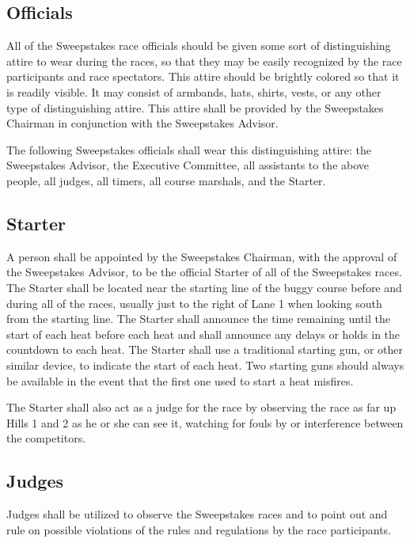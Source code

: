 \subsection{Officials}

	All of the Sweepstakes race officials should be given some sort of distinguishing attire to wear during the races, so that they may be easily recognized by the race participants and race spectators. This attire should be brightly colored so that it is readily visible. It may consist of armbands, hats, shirts, vests, or any other type of distinguishing attire. This attire shall be provided by the Sweepstakes Chairman in conjunction with the Sweepstakes Advisor.

	The following Sweepstakes officials shall wear this distinguishing attire: the Sweepstakes Advisor, the Executive Committee, all assistants to the above people, all judges, all timers, all course marshals, and the Starter.

\subsection{Starter}

	A person shall be appointed by the Sweepstakes Chairman, with the approval of the Sweepstakes Advisor, to be the official Starter of all of the Sweepstakes races. The Starter shall be located near the starting line of the buggy course before and during all of the races, usually just to the right of Lane 1 when looking south from the starting line. The Starter shall announce the time remaining until the start of each heat before each heat and shall announce any delays or holds in the countdown to each heat. The Starter shall use a traditional starting gun, or other similar device, to indicate the start of each heat. Two starting guns should always be available in the event that the first one used to start a heat misfires.

	The Starter shall also act as a judge for the race by observing the race as far up Hills 1 and 2 as he or she can see it, watching for fouls by or interference between the competitors.

\subsection{Judges}

	Judges shall be utilized to observe the Sweepstakes races and to point out and rule on possible violations of the rules and regulations by the race participants.

